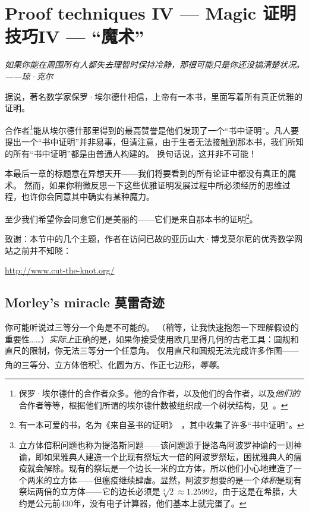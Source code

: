\chapter{Proof techniques IV --- Magic 证明技巧IV --- “魔术”}
\label{ch:magic}

{\em 如果你能在周围所有人都失去理智时保持冷静，那很可能只是你还没搞清楚状况。——琼·克尔} 

\vspace{.3in}

据说，著名数学家保罗·埃尔德什相信，上帝有一本书，里面写着所有真正优雅的证明。

合作者\footnote{保罗·埃尔德什的合作者众多。他的合作者，以及他们的合作者，以及\emph{他们的}合作者等等，根据他们所谓的埃尔德什数被组织成一个树状结构，见~\cite{wiki-Erdos_number}。}能从埃尔德什那里得到的最高赞誉是他们发现了一个“书中证明”。凡人要提出一个“书中证明”并非易事，但请注意，由于生者无法接触到那本书，我们所知的所有“书中证明”都是由普通人构建的。
换句话说，这并非不可能！

本最后一章的标题意在异想天开——我们将要看到的所有论证中都没有真正的魔术。
然而，如果你稍微反思一下这些优雅证明发展过程中所必须经历的思维过程，也许你会同意其中确实有某种魔力。

至少我们希望你会同意它们是美丽的——它们是来自那本书的证明\footnote{有一本可爱的书，名为《来自圣书的证明》~\cite{pftB}，其中收集了许多“书中证明”。}。

致谢：本节中的几个主题，作者在访问已故的亚历山大·博戈莫尔尼的优秀数学网站之前并不知晓：

\url{http://www.cut-the-knot.org/}

\clearpage

\section{Morley's miracle 莫雷奇迹}
\label{sec:morley}

你可能听说过三等分一个角是不可能的。
（稍等，让我快速抱怨一下理解假设的重要性……）\emph{实际上}正确的是，如果你接受使用欧几里得几何的古老工具：圆规和直尺的限制，你无法三等分一个任意角。
仅用直尺和圆规无法完成许多作图——角的三等分、立方体倍积\footnote{立方体倍积问题也称为提洛斯问题——该问题源于提洛岛阿波罗神谕的一则神谕，即如果雅典人建造一个比现有祭坛大一倍的阿波罗祭坛，困扰雅典人的瘟疫就会解除。现有的祭坛是一个边长一米的立方体，所以他们小心地建造了一个两米的立方体——但瘟疫继续肆虐。显然，阿波罗想要的是一个\emph{体积}是现有祭坛两倍的立方体——它的边长必须是$\sqrt[3]{2} \approx 1.25992$，由于这是在希腊，大约是公元前430年，没有电子计算器，他们基本上就完蛋了。}、化圆为方、作正七边形，\emph{等等}。

